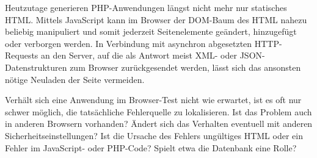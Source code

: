 Heutzutage generieren PHP-Anwendungen längst nicht mehr nur statisches HTML. Mittels
JavaScript kann im Browser der DOM-Baum des HTML nahezu beliebig manipuliert und somit jederzeit Seitenelemente geändert, hinzugefügt oder verborgen werden. In Verbindung mit asynchron abgesetzten HTTP-Requests an den Server, auf die als Antwort meist XML- oder JSON-Datenstrukturen zum Browser zurückgesendet werden, lässt sich das ansonsten nötige Neuladen der Seite vermeiden. %



Verhält sich eine Anwendung im Browser-Test nicht wie erwartet, ist es oft nur schwer möglich, die tatsächliche Fehlerquelle zu lokalisieren. Ist das Problem auch in anderen Browsern vorhanden? Ändert sich das Verhalten eventuell mit anderen Sicherheitseinstellungen? Ist die Ursache des Fehlers ungültiges HTML oder ein Fehler im JavaScript- oder PHP-Code? Spielt etwa die Datenbank eine Rolle?

